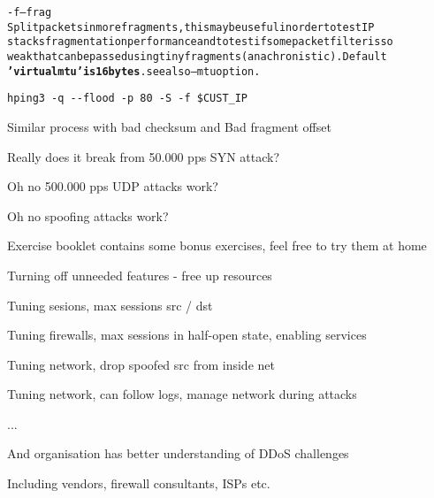 \documentclass[Screen16to9,17pt]{foils}
\begin{document}
\begin{alltt}\small
-f --frag
    Split  packets  in more fragments, this may be useful in order to test IP
    stacks fragmentation performance and to test if some packet filter is  so
    weak  that  can  be  passed using tiny fragments (anachronistic). Default
    {\bf 'virtual mtu' is 16 bytes}. see also --mtu option.
\end{alltt}

\begin{list1}
\item \verb+hping3 -q --flood -p 80 -S -f $CUST_IP+
\item Similar process with bad checksum and Bad fragment offset
\end{list1}



\centerline{Really does it break from 50.000 pps SYN attack?}



\centerline{Oh no 500.000 pps UDP attacks work?}


\centerline{Oh no spoofing attacks work?}






Exercise booklet contains some bonus exercises, feel free to try them at home




\begin{list1}
\item Turning off unneeded features - free up resources
\item Tuning sesions, max sessions src / dst
\item Tuning firewalls, max sessions in half-open state, enabling services
\item Tuning network, drop spoofed src from inside net \smiley
\item Tuning network, can follow logs, manage network during attacks
\item ...
\item And organisation has better understanding of DDoS challenges
\item Including vendors, firewall consultants, ISPs etc.
\end{list1}
\end{document}
